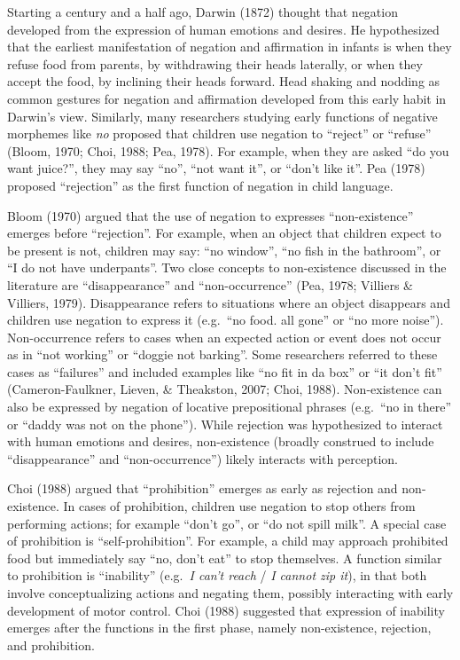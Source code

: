 \documentclass[10pt, letterpaper]{article}
\begin{document}
Starting a century and a half ago, Darwin (1872) thought that negation
developed from the expression of human emotions and desires. He
hypothesized that the earliest manifestation of negation and affirmation
in infants is when they refuse food from parents, by withdrawing their
heads laterally, or when they accept the food, by inclining their heads
forward. Head shaking and nodding as common gestures for negation and
affirmation developed from this early habit in Darwin's view. Similarly,
many researchers studying early functions of negative morphemes like
\emph{no} proposed that children use negation to ``reject'' or
``refuse'' (Bloom, 1970; Choi, 1988; Pea, 1978). For example, when they
are asked ``do you want juice?'', they may say ``no'', ``not want it'',
or ``don't like it''. Pea (1978) proposed ``rejection'' as the first
function of negation in child language.

Bloom (1970) argued that the use of negation to expresses
``non-existence'' emerges before ``rejection''. For example, when an
object that children expect to be present is not, children may say: ``no
window'', ``no fish in the bathroom'', or ``I do not have underpants''.
Two close concepts to non-existence discussed in the literature are
``disappearance'' and ``non-occurrence'' (Pea, 1978; Villiers \&
Villiers, 1979). Disappearance refers to situations where an object
disappears and children use negation to express it (e.g.~``no food. all
gone'' or ``no more noise''). Non-occurrence refers to cases when an
expected action or event does not occur as in ``not working'' or
``doggie not barking''. Some researchers referred to these cases as
``failures'' and included examples like ``no fit in da box'' or ``it
don't fit'' (Cameron-Faulkner, Lieven, \& Theakston, 2007; Choi, 1988).
Non-existence can also be expressed by negation of locative
prepositional phrases (e.g.~``no in there'' or ``daddy was not on the
phone''). While rejection was hypothesized to interact with human
emotions and desires, non-existence (broadly construed to include
``disappearance'' and ``non-occurrence'') likely interacts with
perception.

Choi (1988) argued that ``prohibition'' emerges as early as rejection
and non-existence. In cases of prohibition, children use negation to
stop others from performing actions; for example ``don't go'', or ``do
not spill milk''. A special case of prohibition is ``self-prohibition''.
For example, a child may approach prohibited food but immediately say
``no, don't eat'' to stop themselves. A function similar to prohibition
is ``inability'' (e.g.~\emph{I can't reach} / \emph{I cannot zip it}),
in that both involve conceptualizing actions and negating them, possibly
interacting with early development of motor control. Choi (1988)
suggested that expression of inability emerges after the functions in
the first phase, namely non-existence, rejection, and prohibition.
\end{document}
